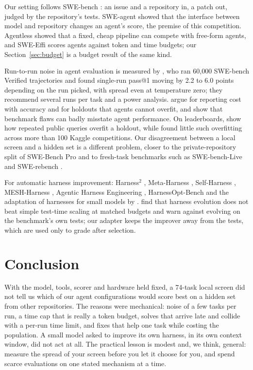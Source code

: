 \documentclass[11pt]{article}
\begin{document}
Our setting follows SWE-bench \citep{jimenez2024swebench}: an issue and a repository in, a patch out, judged by the
repository's tests. SWE-agent \citep{yang2024sweagent} showed that the interface between model and repository changes an
agent's score, the premise of this competition. Agentless \citep{xia2025agentless} showed that a fixed, cheap pipeline can
compete with free-form agents, and SWE-Effi \citep{fan2025sweeffi} scores agents against token and time budgets; our
Section~\ref{sec:budget} is a budget result of the same kind.

Run-to-run noise in agent evaluation is measured by \citet{bjarnason2026randomness}, who ran 60{,}000 SWE-bench Verified
trajectories and found single-run pass@1 moving by 2.2 to 6.0 points depending on the run picked, with spread even at
temperature zero; they recommend several runs per task and a power analysis. \citet{kapoor2024agents} argue for reporting cost
with accuracy and for holdouts that agents cannot overfit, and \citet{zhu2025abc} show that benchmark flaws can badly misstate
agent performance. On leaderboards, \citet{blum2015ladder} show how repeated public queries overfit a holdout, while
\citet{roelofs2019meta} found little such overfitting across more than 100 Kaggle competitions. Our disagreement between a
local screen and a hidden set is a different problem, closer to the private-repository split of SWE-Bench Pro
\citep{deng2025swebenchpro} and to fresh-task benchmarks such as SWE-bench-Live \citep{zhang2025swebenchlive} and
SWE-rebench \citep{badertdinov2025swerebench}.

For automatic harness improvement: Harness$^2$ \citep{xu2026harness2}, Meta-Harness \citep{lee2026metaharness},
Self-Harness \citep{zhang2026selfharness}, MESH-Harness \citep{shang2026mesh}, Agentic Harness Engineering
\citep{lin2026ahe}, HarnessOpt-Bench \citep{ursekar2026harnessopt} and the adaptation of harnesses for small models by
\citet{yang2026better}. \citet{wang2026rethinking} find that harness evolution does not beat simple test-time scaling at
matched budgets and warn against evolving on the benchmark's own tests; our adapter keeps the improver away from the tests,
which are used only to grade after selection.

\section{Conclusion}

With the model, tools, scorer and hardware held fixed, a 74-task local screen did not tell us which of our agent
configurations would score best on a hidden set from other repositories. The reasons were mechanical: noise of a few tasks
per run, a time cap that is really a token budget, solves that arrive late and collide with a per-run time limit, and fixes
that help one task while costing the population. A small model asked to improve its own harness, in its own context window,
did not act at all. The practical lesson is modest and, we think, general: measure the spread of your screen before you let
it choose for you, and spend scarce evaluations on one stated mechanism at a time.
\end{document}
